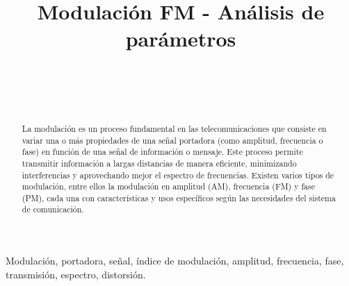 \documentclass[conference]{IEEEtran}
\begin{document}
	
	\title{Modulación FM - Análisis de parámetros}
	\author{
		\\
		\\
		\\
		\and
		\and
		\and
	}
	
	\maketitle
	\begin{abstract}
		La modulación es un proceso fundamental en las telecomunicaciones que consiste en variar una o más propiedades de una señal portadora (como amplitud, frecuencia o fase) en función de una señal de información o mensaje. Este proceso permite transmitir información a largas distancias de manera eficiente, minimizando interferencias y aprovechando mejor el espectro de frecuencias. Existen varios tipos de modulación, entre ellos la modulación en amplitud (AM), frecuencia (FM) y fase (PM), cada una con características y usos específicos según las necesidades del sistema de comunicación.
		
	\end{abstract}
	
	\begin{IEEEkeywords}
		Modulación, portadora, señal, índice de modulación, amplitud, frecuencia, fase, transmisión, espectro, distorsión.
	\end{IEEEkeywords}
	
	
\end{document}
